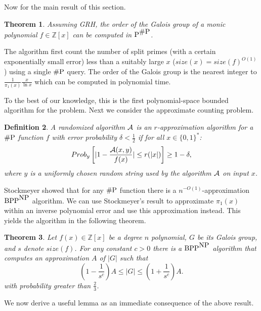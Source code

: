 \documentclass{article}
\newtheorem{theorem}{Theorem}[section]
\newtheorem{definition}[theorem]{Definition}
\newcommand{\Z}[0]{\ensuremath{\mathbb{Z}}}
\newcommand{\BPP}{\mbox{\rm BPP}}
\newcommand{\NP}{\mbox{\rm NP}}
\newcommand{\p}{\mbox{\rm P}}
\newcommand{\numP}{\mbox{\rm \#P}}
\begin{document}
Now for the main result of this section.

\begin{theorem}\label{order}
  Assuming GRH, the order of the Galois group of a monic polynomial $f
  \in \Z[x]$ can be computed in $\p^{\numP}$.
\end{theorem}
The algorithm first count the number of split primes (with a certain
exponentially small error) less than a suitably large $x$ ($size(x) =
size(f)^{O(1)}$) using a single $\numP$ query.  The order of the
Galois group is the nearest integer to
$\frac{1}{\pi_1(x)}\frac{x}{\ln x}$ which can be computed in
polynomial time.

To the best of our knowledge, this is the first polynomial-space
bounded algorithm for the problem.  Next we consider the approximate
counting problem.

\begin{definition}
  A randomized algorithm ${\cal A}$ is an $r$-approximation algorithm
  for a $\numP$ function $f$ with error probability $\delta <
  \frac{1}{2}$ if for all $x \in \{ 0,1\}^*$:
  \[
  Prob_{y}\left[|1 -\frac{{\cal A}(x,y)}{f(x)}|\leq r(|x|)\right]\geq 1-\delta,
  \]
  where $y$ is a uniformly chosen random string used by the algorithm
  ${\cal A}$ on input $x$.
\end{definition}

Stockmeyer \cite{stockmeyer:1985:approx} showed that for any $\numP$
function there is a $n^{-O(1)}$-approximation $\BPP^{\NP}$ algorithm.
We can use Stockmeyer's result to approximate $\pi_1(x)$ within an
inverse polynomial error and use this approximation instead. This
yields the algorithm in the following theorem.

\begin{theorem}\label{approx:G}
  Let $f(x)\in \Z[x]$ be a degree $n$ polynomial, $G$ be its Galois
  group, and $s$ denote $size(f)$. For any constant $c>0$ there is a
  $\BPP^{\NP}$ algorithm that computes an approximation $A$ of $|G|$
  such that
  \[
  \left(1 - \frac{1}{s^c}\right) A \leq |G| \leq \left(1 +
    \frac{1}{s^c} \right) A.
  \]
  with probability greater than $\frac{2}{3}$.
\end{theorem}

We now derive a useful lemma as an immediate consequence of the above
result.
\end{document}
